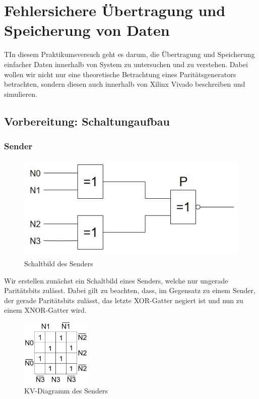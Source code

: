 \documentclass{article}
\begin{document}
\newpage


\tableofcontents

\listoffigures

\newpage

\section{Fehlersichere Übertragung und Speicherung von Daten}

\begin{task}
  TIn diesem Praktikumsversuch geht es darum, die Übertragung und Speicherung einfacher Daten innerhalb von System zu untersuchen und zu verstehen. Dabei wollen wir nicht nur eine theoretische Betrachtung eines Paritätsgenerators betrachten, sondern diesen auch innerhalb von Xilinx Vivado beschreiben und simulieren.
\end{task}

\subsection{Vorbereitung: Schaltungaufbau}

\subsubsection{Sender}

\begin{figure}[h]
  \centering
  \includegraphics[width=\textwidth]{../assets/images/DI1/SenderSchalt.png}
  \caption{Schaltbild des Senders}
  \label{fig:schalt1}
\end{figure}

Wir erstellen zunächst ein Schaltbild eines Senders, welche nur ungerade Paritätsbits zulässt. Dabei gilt zu beachten, dass, im Gegensatz zu einem Sender, der gerade Paritätsbits zulässt, das letzte XOR-Gatter negiert ist und nun zu einem XNOR-Gatter wird.
\begin{figure}[h]
  \centering
  \includegraphics[width=0.3\textwidth]{../assets/images/DI1/SenderKV.png}
  \caption{KV-Diagramm des Senders}
  \label{fig:kv1}
\end{figure}
\end{document}
